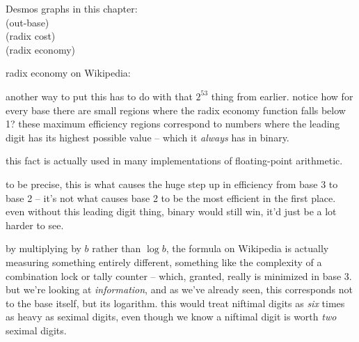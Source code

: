 \documentclass[../footnotes.tex]{subfiles}
\begin{document}
\myfootnote{} Desmos graphs in this chapter: \\
 (out-base) \\
 (radix cost) \\
 (radix economy)

\myfootnote{} radix economy on Wikipedia: \\

\myfootnote{} another way to put this has to do with that $2^{53}$ thing from earlier. notice how for every base there are small regions where the radix economy function falls below 1? these maximum efficiency regions correspond to numbers where the leading digit has its highest possible value -- which it \emph{always} has in binary.

\myfootnote{} this fact is actually used in many implementations of floating-point arithmetic.

\myfootnote{} to be precise, this is what causes the huge step up in efficiency from base 3 to base 2 -- it's not what causes base 2 to be the most efficient in the first place. even without this leading digit thing, binary would still win, it'd just be a lot harder to see.

\myfootnote{} by multiplying by $b$ rather than $\log b$, the formula on Wikipedia is actually measuring something entirely different, something like the complexity of a combination lock or tally counter -- which, granted, really is minimized in base 3. but we're looking at \emph{information}, and as we've already seen, this corresponds not to the base itself, but its logarithm. this would treat niftimal digits as \emph{six} times as heavy as seximal digits, even though we know a niftimal digit is worth \emph{two} seximal digits.
\end{document}
